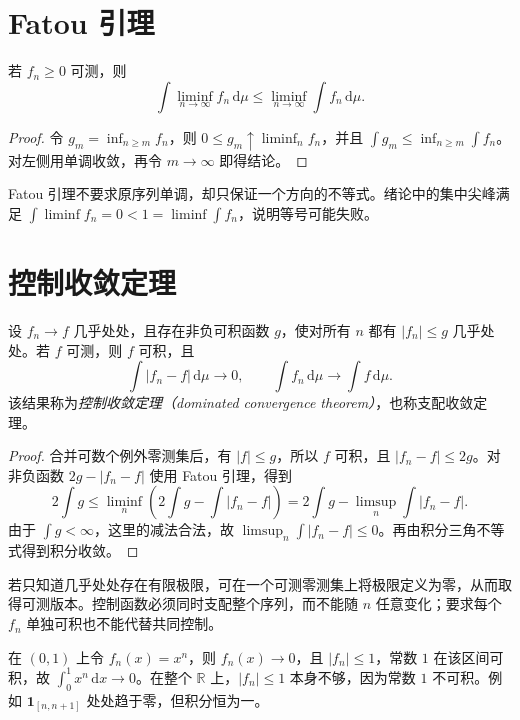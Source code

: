 \section{Fatou 引理}
\begin{theorem}[Fatou 引理]
若 $f_n\geq0$ 可测，则
\begin{equation}
 \int\liminf_{n\to\infty}f_n\,\mathrm d\mu
 \leq\liminf_{n\to\infty}\int f_n\,\mathrm d\mu.
 \label{eq:mt-fatou}
\end{equation}
\label{thm:mt-fatou}
\end{theorem}
\begin{proof}
令 $g_m=\inf_{n\geq m}f_n$，则 $0\leq g_m\uparrow\liminf_nf_n$，并且 $\int g_m\leq\inf_{n\geq m}\int f_n$。对左侧用单调收敛，再令 $m\to\infty$ 即得结论。
\end{proof}
Fatou 引理不要求原序列单调，却只保证一个方向的不等式。绪论中的集中尖峰满足 $\int\liminf f_n=0<1=\liminf\int f_n$，说明等号可能失败。

\section{控制收敛定理}
\begin{theorem}[控制收敛定理]
设 $f_n\to f$ 几乎处处，且存在非负可积函数 $g$，使对所有 $n$ 都有 $|f_n|\leq g$ 几乎处处。若 $f$ 可测，则 $f$ 可积，且
\begin{equation}
 \int|f_n-f|\,\mathrm d\mu\longrightarrow0,\qquad
 \int f_n\,\mathrm d\mu\longrightarrow\int f\,\mathrm d\mu.
 \label{eq:mt-dct}
\end{equation}
该结果称为\emph{控制收敛定理（dominated convergence theorem）}，也称支配收敛定理。
\label{thm:mt-dct}
\end{theorem}
\begin{proof}
合并可数个例外零测集后，有 $|f|\leq g$，所以 $f$ 可积，且 $|f_n-f|\leq2g$。对非负函数 $2g-|f_n-f|$ 使用 Fatou 引理，得到
\[
 2\int g\leq
 \liminf_n\left(2\int g-\int|f_n-f|\right)
 =2\int g-\limsup_n\int|f_n-f|.
\]
由于 $\int g<\infty$，这里的减法合法，故 $\limsup_n\int|f_n-f|\leq0$。再由积分三角不等式得到积分收敛。
\end{proof}

若只知道几乎处处存在有限极限，可在一个可测零测集上将极限定义为零，从而取得可测版本。控制函数必须同时支配整个序列，而不能随 $n$ 任意变化；要求每个 $f_n$ 单独可积也不能代替共同控制。

\begin{example}
在 $(0,1)$ 上令 $f_n(x)=x^n$，则 $f_n(x)\to0$，且 $|f_n|\leq1$，常数 $1$ 在该区间可积，故 $\int_0^1x^n\,\mathrm dx\to0$。在整个 $\mathbb R$ 上，$|f_n|\leq1$ 本身不够，因为常数 $1$ 不可积。例如 $\mathbf1_{[n,n+1]}$ 处处趋于零，但积分恒为一。
\end{example}

